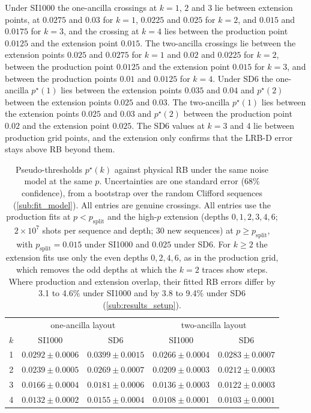 Under SI1000 the one-ancilla crossings at $k = 1$, $2$ and $3$ lie between extension points, at $0.0275$ and $0.03$ for $k = 1$, $0.0225$ and $0.025$ for $k = 2$, and $0.015$ and $0.0175$ for $k = 3$, and the crossing at $k = 4$ lies between the production point $0.0125$ and the extension point $0.015$. The two-ancilla crossings lie between the extension points $0.025$ and $0.0275$ for $k = 1$ and $0.02$ and $0.0225$ for $k = 2$, between the production point $0.0125$ and the extension point $0.015$ for $k = 3$, and between the production points $0.01$ and $0.0125$ for $k = 4$. Under SD6 the one-ancilla $p^\star(1)$ lies between the extension points $0.035$ and $0.04$ and $p^\star(2)$ between the extension points $0.025$ and $0.03$. The two-ancilla $p^\star(1)$ lies between the extension points $0.025$ and $0.03$ and $p^\star(2)$ between the production point $0.02$ and the extension point $0.025$. The SD6 values at $k = 3$ and $4$ lie between production grid points, and the extension only confirms that the LRB-D error stays above RB beyond them.

\begin{table}[htb]
  \centering
  \begin{tabular}{c|cc|cc}
    \hline
    & \multicolumn{2}{c|}{one-ancilla layout} & \multicolumn{2}{c}{two-ancilla layout} \\
    $k$ & SI1000 & SD6 & SI1000 & SD6 \\
    \hline
    1 & $0.0292 \pm 0.0006$ & $0.0399 \pm 0.0015$ & $0.0266 \pm 0.0004$ & $0.0283 \pm 0.0007$ \\
    2 & $0.0239 \pm 0.0005$ & $0.0269 \pm 0.0007$ & $0.0209 \pm 0.0003$ & $0.0212 \pm 0.0003$ \\
    3 & $0.0166 \pm 0.0004$ & $0.0181 \pm 0.0006$ & $0.0136 \pm 0.0003$ & $0.0122 \pm 0.0003$ \\
    4 & $0.0132 \pm 0.0002$ & $0.0155 \pm 0.0004$ & $0.0108 \pm 0.0001$ & $0.0103 \pm 0.0001$ \\
    \hline
  \end{tabular}
  \caption{Pseudo-thresholds $p^\star(k)$ against physical RB under the same noise model at the same $p$. Uncertainties are one standard error (68\% confidence), from a bootstrap over the random Clifford sequences (\autoref{sub:fit_model}). All entries are genuine crossings. All entries use the production fits at $p < p_{\mathrm{split}}$ and the high-$p$ extension (depths $0, 1, 2, 3, 4, 6$; $2\times10^7$ shots per sequence and depth; 30 new sequences) at $p \ge p_{\mathrm{split}}$, with $p_{\mathrm{split}} = 0.015$ under SI1000 and $0.025$ under SD6. For $k \ge 2$ the extension fits use only the even depths $0, 2, 4, 6$, as in the production grid, which removes the odd depths at which the $k = 2$ traces show steps. Where production and extension overlap, their fitted RB errors differ by 3.1 to 4.6\% under SI1000 and by 3.8 to 9.4\% under SD6 (\autoref{sub:results_setup}).}
  \label{tab:pseudo_thresholds}
\end{table}

